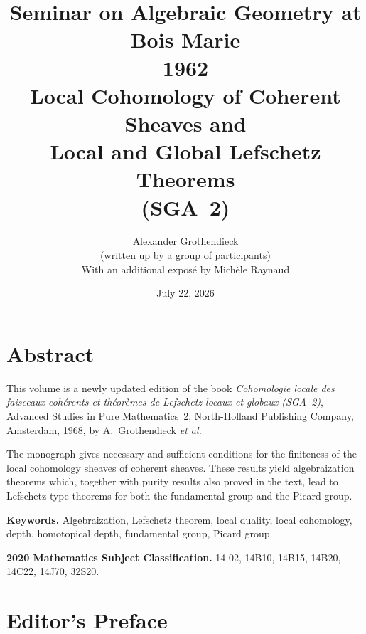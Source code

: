 \documentclass[11pt,a4paper,oneside]{book}
\begin{document}
\frontmatter

\title{Seminar on Algebraic Geometry at Bois Marie\\
   1962\\[0.4em]
   Local Cohomology of Coherent Sheaves and\\
   Local and Global Lefschetz Theorems\\
   (SGA~2)}

\author{Alexander Grothendieck\\
  {\small (written up by a group of participants)}\\[0.5em]
  With an additional expos\'e by Mich\`ele Raynaud}

\date{July 22, 2026}

\maketitle

\chapter*{Abstract}
This volume is a newly updated edition of the book
\emph{Cohomologie locale des faisceaux coh\'erents et th\'eor\`emes de
Lefschetz locaux et globaux (SGA~2)}, Advanced Studies in Pure Mathematics~2,
North-Holland Publishing Company, Amsterdam, 1968, by A.~Grothendieck
\emph{et al.}

The monograph gives necessary and sufficient conditions for the finiteness
of the local cohomology sheaves of coherent sheaves. These results yield
algebraization theorems which, together with purity results also proved in
the text, lead to Lefschetz-type theorems for both the fundamental group and
the Picard group.

\medskip
\noindent\textbf{Keywords.} Algebraization, Lefschetz theorem, local duality,
local cohomology, depth, homotopical depth, fundamental group, Picard group.

\smallskip
\noindent\textbf{2020 Mathematics Subject Classification.}
14-02, 14B10, 14B15, 14B20, 14C22, 14J70, 32S20.

\chapter*{Editor's Preface}
\end{document}
